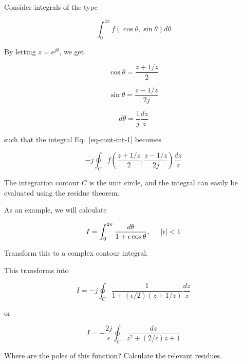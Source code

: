 Consider integrals of the type

\begin{equation}
\int_0^{2 \pi} f(\cos \theta, \sin \theta) d \theta \label{eq-cont-int-1}
\end{equation} 

By letting $z=e^{j \theta}$, we get 

\begin{equation}
\cos \theta = \frac{z + 1/z}{2}
\end{equation} 

\begin{equation}
\sin \theta = \frac{z - 1/z}{2j}
\end{equation} 

\begin{equation}
d \theta = \frac{1}{j}\frac{dz}{z}
\end{equation} 

such that the integral Eq.~\ref{eq-cont-int-1} becomes

\begin{equation}
-j \oint_{{C}} f\left(\frac{z + 1/z}{2}, \frac{z - 1/z}{2j}\right)
\frac{dz}{z}
\end{equation} 

The integration contour ${C}$ is the unit circle, and the integral can easily be evaluated using the residue theorem.

As an example, we will calculate

\begin{equation}
I = \int_0^{2 \pi} \frac{d \theta}{1 + \epsilon \cos \theta}, \hspace{0.5cm}
|\epsilon| < 1
\end{equation} 

\begin{cue}
  Transform this to a complex contour integral.
\end{cue}

This transforms into

\begin{equation}
I = -j \oint_{{C}} \frac{1}{1 + (\epsilon / 2)\left(z + 1/z\right)}
\frac{dz}{z}
\end{equation} 

or

\begin{equation}
I = -\frac{2j}{\epsilon} \oint_{{C}} \frac{dz}{z^2 + (2 / \epsilon)z +
1}
\end{equation} 

\begin{cue}
  Where are the poles of this function? Calculate the relevant residues.
\end{cue}

